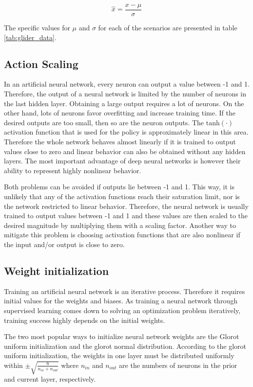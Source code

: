 \begin{equation}
\hat{x} = \frac{x - \mu}{\sigma}
\end{equation}

The specific values for $\mu$ and $\sigma$ for each of the scenarios are presented in table \ref{tab:glider_data}.

\subsection*{Action Scaling}

In an artificial neural network, every neuron can output a value between -1 and 1. Therefore, the output of a neural network is limited by the number of neurons in the last hidden layer. Obtaining a large output requires a lot of neurons. On the other hand, lots of neurons favor overfitting and increase training time. If the desired outputs are too small, then so are the neuron outputs. The $\text{tanh}(\cdot)$ activation function that is used for the policy is approximately linear in this area. Therefore the whole network behaves almost linearly if it is trained to output values close to zero and linear behavior can also be obtained without any hidden layers. The most important advantage of deep neural networks is however their ability to represent highly nonlinear behavior.

Both problems can be avoided if outputs lie between -1 and 1. This way, it is unlikely that any of the activation functions reach their saturation limit, nor is the network restricted to linear behavior. Therefore, the neural network is usually trained to output values between -1 and 1 and these values are then scaled to the desired magnitude by multiplying them with a scaling factor. Another way to mitigate this problem is choosing activation functions that are also nonlinear if the input and/or output is close to zero.

\subsection*{Weight initialization}

Training an artificial neural network is an iterative process. Therefore it requires initial values for the weights and biases. As training a neural network through supervised learning comes down to solving an optimization problem iteratively, training success highly depends on the initial weights.

The two most popular ways to initialize neural network weights are the Glorot uniform initialization and the glorot normal distribution. According to the glorot uniform initialization, the weights in one layer must be distributed uniformly within $\pm \sqrt{\frac{6}{n_{in}+n_{out}}}$ where $n_{in}$ and $n_{out}$ are the numbers of neurons in the prior and current layer, respectively.

